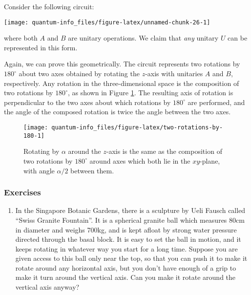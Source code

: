 \documentclass{article}
\providecommand{\tightlist}{%
  \setlength{\itemsep}{0pt}\setlength{\parskip}{0pt}}
\begin{document}
Consider the following circuit:

\begin{center}\texttt{[image: quantum-info\_files/figure-latex/unnamed-chunk-26-1]} \end{center}

where both \(A\) and \(B\) are unitary operations.
We claim that \emph{any} unitary \(U\) can be represented in this form.

Again, we can prove this geometrically.
The circuit represents two rotations by \(180^\circ\) about two axes obtained by rotating the \(z\)-axis with unitaries \(A\) and \(B\), respectively.
Any rotation in the three-dimensional space is the composition of two rotations by \(180^\circ\), as shown in Figure \ref{fig:two-rotations-by-180}.
The resulting axis of rotation is perpendicular to the two axes about which rotations by \(180^\circ\) are performed, and the angle of the composed rotation is twice the angle between the two axes.



\begin{figure}[H]

{\centering \texttt{[image: quantum-info\_files/figure-latex/two-rotations-by-180-1]} 

}

\caption{Rotating by \(\alpha\) around the \(z\)-axis is the same as the composition of two rotations by \(180^\circ\) around axes which both lie in the \(xy\)-plane, with angle \(\alpha/2\) between them.}\label{fig:two-rotations-by-180}
\end{figure}

\hypertarget{exercises-4}{%
\subsubsection{Exercises}\label{exercises-4}}

\begin{enumerate}
\def\labelenumi{\arabic{enumi}.}
\tightlist
\item
  In the Singapore Botanic Gardens, there is a sculpture by Ueli Fausch called ``Swiss Granite Fountain''.
  It is a spherical granite ball which measures 80cm in diameter and weighs 700kg, and is kept afloat by strong water pressure directed through the basal block.
  It is easy to set the ball in motion, and it keeps rotating in whatever way you start for a long time.
  Suppose you are given access to this ball only near the top, so that you can push it to make it rotate around any horizontal axis, but you don't have enough of a grip to make it turn around the vertical axis.
  Can you make it rotate around the vertical axis anyway?
\end{enumerate}
\end{document}
